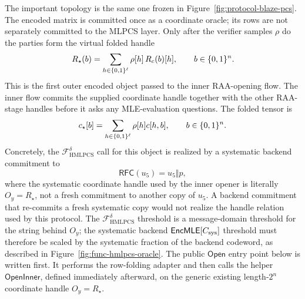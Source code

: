 The important topology is the same one frozen in
Figure~\ref{fig:protocol-blaze-pcs}.  The encoded matrix is committed once as a
coordinate oracle; its rows are not separately committed to the MLPCS layer.
Only after the verifier samples \(\rho\) do the parties form the virtual folded
handle
\[
  R_\star(b)
  =
  \sum_{h\in\{0,1\}^\ell}\rho[h]\,R_c(b)[h],
  \qquad b\in\{0,1\}^n.
\]
This is the first outer encoded object passed to the inner RAA-opening flow.
The inner flow commits the supplied coordinate handle together with the other
RAA-stage handles before it asks any MLE-evaluation questions.
The folded tensor is
\[
  c_\star[b]=\sum_{h\in\{0,1\}^\ell}\rho[h]c[h,b],
  \qquad b\in\{0,1\}^n.
\]
Concretely, the \(\mathcal F_{\mathrm{HMLPCS}}^\delta\) call for this object is
realized by a systematic backend commitment to
\[
  \mathsf{RFC}(u_5)=u_5\Vert p,
\]
where the systematic coordinate handle used by the inner opener is literally
\(O_y=R_\star\), not a fresh commitment to another copy of \(u_5\).  A backend
commitment that re-commits a fresh systematic copy would not realize the handle
relation used by this protocol.  The \(\mathcal F_{\mathrm{HMLPCS}}^\delta\)
threshold is a message-domain threshold for the string behind \(O_y\); the
systematic backend \(\mathsf{EncMLE}[C_{\mathrm{sys}}]\) threshold must therefore be
scaled by the systematic fraction of the backend codeword, as described in
Figure~\ref{fig:func-hmlpcs-oracle}.
The public \(\mathsf{Open}\) entry point below is written first.  It performs
the row-folding adapter and then calls the helper
\(\mathsf{OpenInner}\), defined immediately afterward, on the generic existing
length-\(2^n\) coordinate handle \(O_y=R_\star\).

